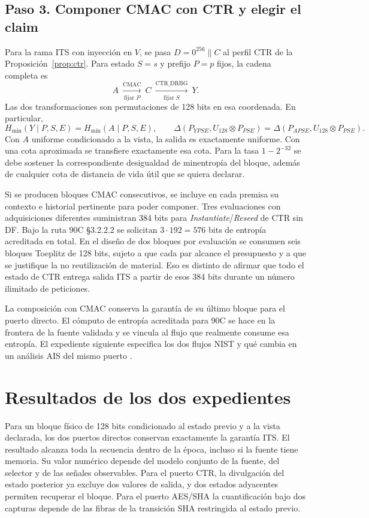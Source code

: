 \documentclass[11pt,a4paper]{article}
\newcommand{\hm}{H_{\min}}
\newcommand{\dist}{\Delta}
\begin{document}
\subsection{Paso 3. Componer CMAC con CTR y elegir el claim}

Para la rama ITS con inyección en \(V\), se pasa
\(D=0^{256}\|C\) al perfil CTR de la
Proposición~\ref{prop:ctr}. Para estado \(S=s\) y prefijo
\(P=p\) fijos, la cadena completa es
\[
 A\ \xrightarrow[\text{fijar }P]{\mathrm{CMAC}}\ C
 \ \xrightarrow[\text{fijar }S]{\mathrm{CTR\_DRBG}}\ Y .
\]
Las dos transformaciones son permutaciones de 128 bits en
esa coordenada. En particular,
\[
 \hm(Y\mid P,S,E)=\hm(A\mid P,S,E),\qquad
 \dist(P_{YPSE},U_{128}\otimes P_{PSE})
   =\dist(P_{APSE},U_{128}\otimes P_{PSE}).
\]
Con \(A\) uniforme condicionado a la vista, la salida
es exactamente uniforme. Con una cota aproximada se
transfiere exactamente esa cota. Para la tasa \(1-2^{-32}\)
se debe sostener la correspondiente desigualdad de
minentropía del bloque, además de cualquier cota de
distancia de vida útil que se quiera declarar.

Si se producen bloques CMAC consecutivos, se incluye en
cada premisa su contexto e historial pertinente para poder
componer. Tres evaluaciones con adquisiciones diferentes
suministran 384 bits para \emph{Instantiate}/\emph{Reseed}
de CTR sin DF. Bajo la ruta 90C §3.2.2.2 se solicitan
\(3\cdot192=576\) bits de entropía acreditada en total.
En el diseño de dos bloques por evaluación se consumen
seis bloques Toeplitz de 128 bits, sujeto a que cada par
alcance el presupuesto y a que se justifique la no
reutilización de material. Eso es distinto de afirmar
que todo el estado de CTR entrega salida ITS a partir
de esos 384 bits durante un número ilimitado de peticiones.

La composición con CMAC conserva la garantía de su último bloque para el puerto
directo. El cómputo de entropía acreditada para 90C se hace en la frontera de la
fuente validada y se vincula al flujo que realmente consume esa entropía. El
expediente siguiente especifica los dos flujos NIST y qué cambia en un análisis
AIS del mismo puerto \cite[§§3.2.2.2 y 6.3--6.5]{nist90c}.





\section{Resultados de los dos expedientes}
\label{sec:final}
Para un bloque físico de 128 bits condicionado al estado previo y a la vista
declarada, los dos puertos directos conservan exactamente la garantía ITS.
El resultado alcanza toda la secuencia dentro de la época, incluso si la fuente
tiene memoria. Su valor numérico depende del modelo conjunto de la fuente,
del selector y de las señales observables. Para el puerto CTR, la divulgación
del estado posterior ya excluye dos valores de salida, y dos estados adyacentes
permiten recuperar el bloque. Para el puerto AES/SHA la cuantificación bajo dos
capturas depende de las fibras de la transición SHA restringida al estado previo.
\end{document}
